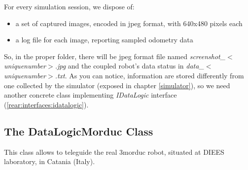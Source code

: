 For every simulation session, we dispose of:

\begin{itemize}
  \item a set of captured images, encoded in jpeg format,
    with 640x480 pixels each
  \item a log file for each image, reporting sampled odometry data
\end{itemize}

So, in the proper folder, there will be jpeg format file named
\textit{screenshot\_$<$uniquenumber$>$.jpg} and the coupled robot's
data status in \textit{data\_$<$uniquenumber$>$.txt}. As you can notice,
information are stored differently from one collected by the simulator
(exposed in chapter \ref{simulator}), so we need another concrete
class implementing \textit{IDataLogic} interface
(\ref{rear:interfaces:idatalogic}).


\subsection{The DataLogicMorduc Class}
\label{concr:idatalogic:datalogicmorduc}

This class allows \framework{} to teleguide the real 3morduc
robot, situated at DIEES laboratory, in Catania (Italy).
